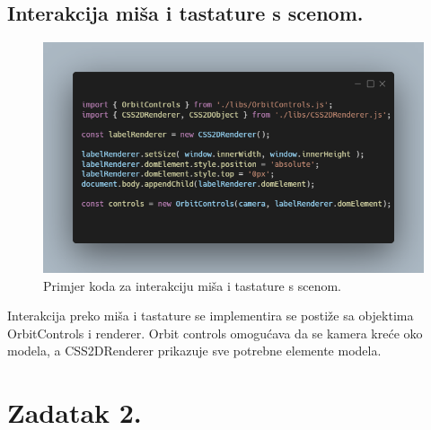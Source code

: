 \documentclass[a4paper,12pt]{article}
\begin{document}
\subsection{Interakcija miša i tastature s scenom.}
\begin{figure}[ht]
    \centering
    \includegraphics[scale=0.5]{image/zadatak1_kontrole.png}
    \caption{Primjer koda za interakciju miša i tastature s scenom.}
\end{figure}

Interakcija preko miša i tastature se implementira se postiže sa objektima OrbitControls i renderer. Orbit controls omogućava da se kamera kreće oko modela,
a CSS2DRenderer prikazuje sve potrebne elemente modela.

\pagebreak
\section{Zadatak 2.}
\end{document}
